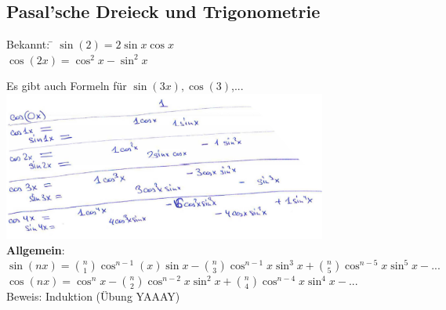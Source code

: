 \subsection{ Pasal'sche Dreieck und Trigonometrie}
\begin{tabbing}
	Bekannt: \= $\sin(2) = 2\sin x \cos x$\\
	\> $\cos(2x)=\cos^2x-\sin^2x$
\end{tabbing}
Es gibt auch Formeln für $\sin(3x) , \cos(3)$,...\smallskip\\
\includegraphics[width=0.8\textwidth]{img/ayy.PNG}\medskip\\
\textbf{Allgemein}:\\
$\sin(nx) = \binom{n}{1}\cos^{n-1}(x) \sin x - \binom{n}{3}\cos^{n-1}x \sin^3x + \binom{n}{5} \cos^{n-5}x \sin^5x-...$\medskip\\
$\cos(nx) = \cos^nx - \binom{n}{2}\cos^{n-2}x\sin^2x+\binom{n}{4}\cos^{n-4}x\sin^4x-...$\medskip\\
Beweis: Induktion (Übung YAAAY)

